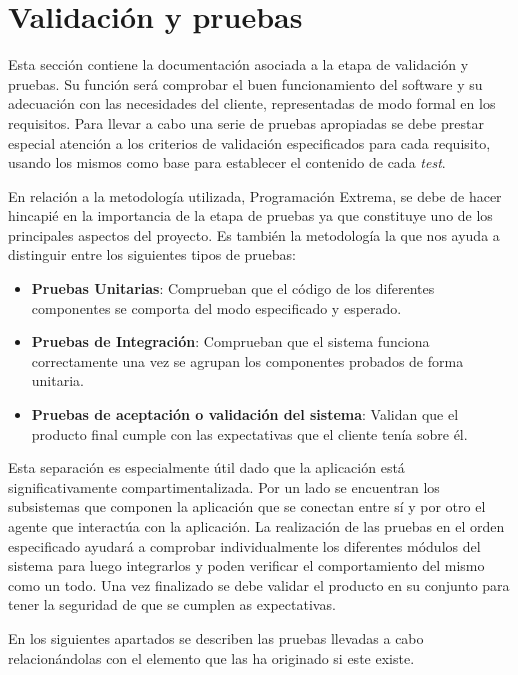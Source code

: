 \chapter{Validación y pruebas}

Esta sección contiene la documentación asociada a la etapa de validación y pruebas. Su función será comprobar el buen funcionamiento del software y su adecuación con las necesidades del cliente, representadas de modo formal en los requisitos. Para llevar a cabo una serie de pruebas apropiadas se debe prestar especial atención a los criterios de validación especificados para cada requisito, usando los mismos como base para establecer el contenido de cada \textit{test}.

\bigskip

En relación a la metodología utilizada, Programación Extrema, se debe de hacer hincapié en la importancia de la etapa de pruebas ya que constituye uno de los principales aspectos del proyecto. Es también la metodología la que nos ayuda a distinguir entre los siguientes tipos de pruebas:

\begin{itemize}
	\item \textbf{Pruebas Unitarias}: Comprueban que el código de los diferentes componentes se comporta del modo especificado y esperado.
	\item \textbf{Pruebas de Integración}: Comprueban que el sistema funciona correctamente una vez se agrupan los componentes probados de forma unitaria.
	\item \textbf{Pruebas de aceptación o validación del sistema}: Validan que el producto final cumple con las expectativas que el cliente tenía sobre él.
\end{itemize}

Esta separación es especialmente útil dado que la aplicación está significativamente compartimentalizada. Por un lado se encuentran los subsistemas que componen la aplicación que se conectan entre sí y por otro el agente que interactúa con la aplicación. La realización de las pruebas en el orden especificado ayudará a comprobar individualmente los diferentes módulos del sistema para luego integrarlos y poden verificar el comportamiento del mismo como un todo. Una vez finalizado se debe validar el producto en su conjunto para tener la seguridad de que se cumplen as expectativas.

\bigskip

En los siguientes apartados se describen las pruebas llevadas a cabo relacionándolas con el elemento que las ha originado si este existe.

